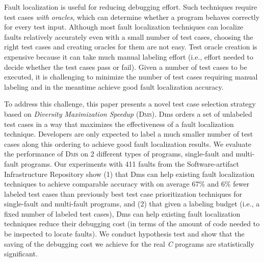 Fault localization is useful for reducing debugging effort. 
Such techniques require test cases {\em with oracles}, which can determine whether a program behaves correctly for every test input. 
Although most fault localization techniques can localize faults relatively accurately even with a small number of test cases, choosing the right test cases and creating oracles for them are not easy.
Test oracle creation is expensive because it can take much manual labeling effort (i.e., effort needed to decide whether the test cases pass or fail). Given a number of test cases to be executed, it is challenging to minimize the number of test cases requiring manual labeling and in the meantime achieve good fault localization accuracy.

To address this challenge, this paper presents a novel test case selection strategy based on {\em Diversity Maximization Speedup} (\textsc{Dms}). {\sc Dms} orders a set of unlabeled test cases in a way that maximizes the effectiveness of a fault localization technique. Developers are only expected to label a much smaller number of test cases along this ordering to achieve good fault localization results. We evaluate the performance of \textsc{Dms} on 2 different types of programs, single-fault and multi-fault programs. Our experiments with 411 faults from the Software-artifact Infrastructure Repository show (1) that {\sc Dms} can help existing fault localization techniques to achieve comparable accuracy with on average 67\% and 6\% fewer labeled test cases than previously best test case prioritization techniques for single-fault and multi-fault programs, and (2) that given a labeling budget (i.e., a fixed number of labeled test cases), {\sc Dms} can help existing fault localization techniques reduce their debugging cost (in terms of the amount of code needed to be inspected to locate faults). We conduct hypothesis test and show that the saving of the debugging cost we achieve for the real {\em C} programs are statistically significant.









